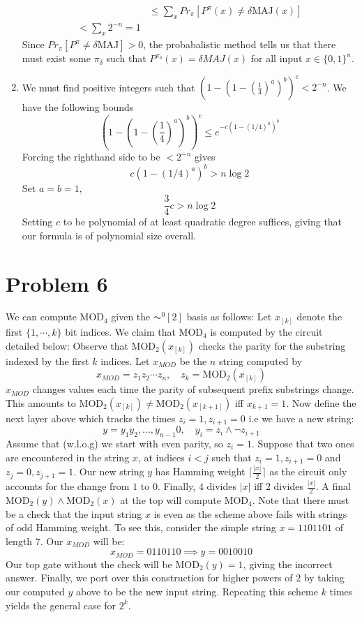\documentclass[12pt]{article}%
\begin{document}
\begin{enumerate}
\begin{align*}
       & \leq \sum_{x} Pr_\pi[ P^{\pi}(x) \neq \delta\text{MAJ}(x)] \\
       < \sum_{x} 2^{-n} = 1
     \end{align*}
     Since $Pr_\pi[P^{\pi}\neq \delta\text{MAJ}] > 0$, the probabalistic method tells us that there must exist some $\pi_\delta$ such that $P^{\pi_\delta}(x) = \delta MAJ(x)$ for all input $x \in \{0,1\}^n$.
     \item
     We must find positive integers such that
     $\left(1 -  \left( 1 - \left( \frac{1}{4} \right)^a \right)^b \right)^c < 2^{-n}$. We have the following bounds
     $$ \left(1 -  \left( 1 - \left( \frac{1}{4} \right)^a \right)^b \right)^c \leq e^{-c(1 - (1/4)^a)^b}$$
     Forcing the righthand side to be $< 2^{-n}$ gives
     $$ c(1 - (1/4)^a)^b > n \log 2 $$
     Set $a = b = 1$,
     $$\frac{3}{4}c > n \log 2 $$
     Setting $c$ to be polynomial of at least quadratic degree suffices, giving that our formula is of polynomial size overall.
\end{enumerate}

\section{Problem 6}
We can compute MOD$_4$ given the $\AC^0[2]$ basis as follows: Let $x_{[k]}$ denote the first $\{1,\cdots, k\}$ bit indices. We claim that MOD$_4$ is computed by the circuit detailed below:
Observe that $\text{MOD}_{2}(x_{[k]})$ checks the parity for the substring indexed by the first $k$ indices. Let $x_{MOD}$ be the $n$ string computed by
$$x_{MOD} = z_1 z_2 \cdots z_n, \quad z_k = \text{MOD}_{2}(x_{[k]})$$
$x_{MOD}$ changes values each time the parity of subsequent prefix substrings change. This amounts to $\text{MOD}_{2}(x_{[k]}) \neq \text{MOD}_{2}(x_{[k+1]})$ iff $x_{k+1} = 1$. Now define the next layer above which tracks the times $z_i = 1, z_{i+1} = 0$ i.e we have a new string:
$$ y = y_1y_2, ..., y_{n-1}0, \quad y_{i} =  z_{i} \wedge  \neg z_{i+1} $$
Assume that (w.l.o.g) we start with even parity, so $z_i = 1$. Suppose that two ones are encountered in the string $x$, at indices $i < j$ such that $z_{i} = 1, z_{i+1}= 0$ and $z_{j} = 0, z_{j+1} = 1$. Our new string $y$ has Hamming weight $\lceil \frac{|x|}{2} \rceil$ as the circuit only accounts for the change from $1$ to $0$. Finally, $4$ divides $|x|$ iff $2$ divides $\frac{|x|}{2}$. A final MOD$_{2}(y) \wedge \text{MOD}_2(x)$ at the top will compute MOD$_4$. Note that there must be a check that the input string $x$ is even as the scheme above fails with strings of odd Hamming weight. To see this, consider the simple string $x = 1101101$ of length $7$. Our $x_{MOD}$ will be:
$$x_{MOD} = 0110110 \implies y = 0010010 $$ Our top gate without the check will be MOD$_{2}(y) = 1$, giving the incorrect answer. Finally, we port over this construction for higher powers of $2$ by taking our computed $y$ above to be the new input string. Repeating this scheme $k$ times yields the general case for $2^k$.
\end{document}

